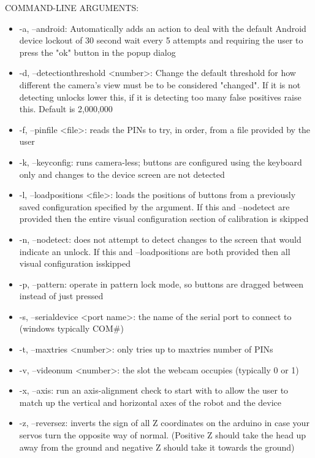 \documentclass[a4paper,12pt]{letter}
\begin{document}
COMMAND-LINE ARGUMENTS:
\begin{itemize}
\item -a, --android: Automatically adds an action to deal with the default Android device lockout of 30 second wait every 5 attempts and requiring the user to press the "ok" button in the popup dialog
\item -d, --detectionthreshold <number>: Change the default threshold for how different the camera's view must be to be considered "changed". If it is not detecting unlocks lower this, if it is detecting too many false positives raise this. Default is 2,000,000
\item -f, --pinfile <file>: reads the PINs to try, in order, from a file provided by the user
\item -k, --keyconfig: runs camera-less; buttons are configured using the keyboard only and changes to the device screen are not detected
\item -l, --loadpositions <file>: loads the positions of buttons from a previously saved configuration specified by the argument. If this and --nodetect are provided then the entire visual configuration section of calibration is skipped
\item -n, --nodetect: does not attempt to detect changes to the screen that would indicate an unlock. If this and --loadpositions are both provided then all visual configuration isskipped
\item -p, --pattern: operate in pattern lock mode, so buttons are dragged between instead of just pressed
\item -s, --serialdevice <port name>: the name of the serial port to connect to (windows typically COM\#) 
\item -t, --maxtries <number>: only tries up to maxtries number of PINs
\item -v, --videonum <number>: the slot the webcam occupies (typically 0 or 1)
\item -x, --axis: run an axis-alignment check to start with to allow the user to match up the vertical and horizontal axes of the robot and the device
\item -z, --reversez: inverts the sign of all Z coordinates on the arduino in case your servos turn the opposite way of normal. (Positive Z should take the head up away from the ground and negative Z should take it towards the ground)
\end{itemize}
\end{document}
